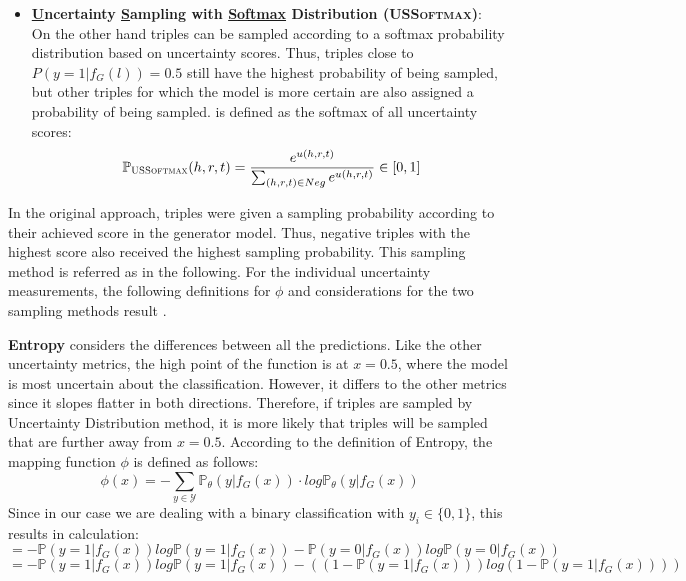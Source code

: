 \begin{itemize}
    \item
    \textbf{\underline{U}ncertainty \underline{S}ampling with \underline{Softmax} Distribution (\textsc{USSoftmax})}:\\
    
    On the other hand triples can be sampled according to a softmax probability distribution based on uncertainty scores.
    Thus, triples close to $P(y = 1 | f_G(l)) = 0.5$ still have the highest probability of being sampled, but other triples for which the model is more certain are also assigned a probability of being sampled.
    \ussoftmax is defined as the softmax of all uncertainty scores:
    \begin{equation}
        \label{eq:ussoftmax}
        \mathbb{P}_{\textsc{USSoftmax}}(h,r,t) = \frac{e^{u(h,r,t)}}{\sum_{(h,r,t) \in Neg}{e^{u(h,r,t)}}} \in [0,1]
    \end{equation}
\end{itemize}
In the original \kbgan approach, triples were given a sampling probability according to their achieved score in the generator model.
Thus, negative triples with the highest score also received the highest sampling probability.
This sampling method is referred as \origsampling in the following.
For the individual uncertainty measurements, the following definitions for $\phi$ and considerations for the two sampling methods result \cite{human-in-the-loop}.

\textbf{Entropy} 
considers the differences between all the predictions.
Like the other uncertainty metrics, the high point of the function is at $x = 0.5$, where the model is most uncertain about the classification.
However, it differs to the other metrics since it slopes flatter in both directions.
Therefore, if triples are sampled by Uncertainty Distribution method, it is more likely that triples will be sampled that are further away from $x=0.5$.
According to the definition of Entropy, the mapping function $\phi$ is defined as follows:
\begin{equation}
    \phi(x) = - \sum_{y \in \mathcal{Y}}{\mathds{P}_{\theta}(y | f_G(x)) \cdot log \mathds{P}_{\theta}(y | f_G(x))}
\end{equation}
Since in our case we are dealing with a binary classification with $y_i \in \{0,1\}$, this results in calculation:
\begin{equation}
= - \mathds{P}(y = 1| f_G(x)) log \mathds{P}(y = 1 | f_G(x))
- \mathds{P}(y = 0| f_G(x)) log \mathds{P}(y = 0 | f_G(x))
\end{equation}
\begin{equation}
= - \mathds{P}(y = 1| f_G(x) ) log \mathds{P}(y = 1 | f_G(x))
- ((1 - \mathds{P}(y = 1 | f_G(x)))
     log(1 - \mathds{P}(y = 1 | f_G(x))))
\end{equation}

